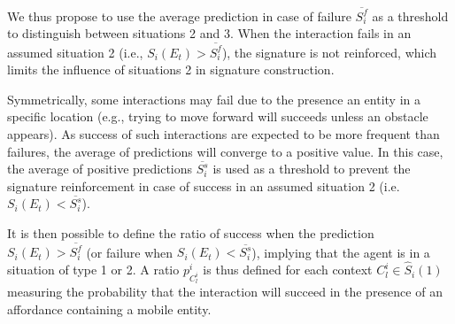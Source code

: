 \documentclass[conference]{IEEEtran}
\begin{document}
We thus propose to use the average prediction in case of failure $\overline{S_i^f}$ as a threshold to distinguish between situations 2 and 3.
When the interaction fails in an assumed situation 2 (i.e., $S_i(E_t)>\overline{S_i^f}$), the signature is not reinforced, which limits the influence of situations 2 in signature construction. 


Symmetrically, some interactions may fail due to the presence an entity in a specific location (e.g., trying to move forward will succeeds unless an obstacle appears).
As success of such interactions are expected to be more frequent than failures, the average of predictions will converge to a positive value.
In this case, the average of positive predictions $\overline{S_i^s}$ is used as a threshold to prevent the signature reinforcement in case of success in an assumed situation 2 (i.e. $S_i(E_t)<\overline{S_i^s}$).



It is then possible to define the ratio of success when the prediction $S_i(E_t)>\overline{S_i^f}$ (or failure when $S_i(E_t)<\overline{S_i^s}$), implying that the agent is in a situation of type 1 or 2. A ratio $p_{C_l^i}^i$ is thus defined for each context $C_l^i \in \hat{S}_i(1)$
measuring the probability that the interaction will succeed in the presence of an affordance containing a mobile entity.
\end{document}
